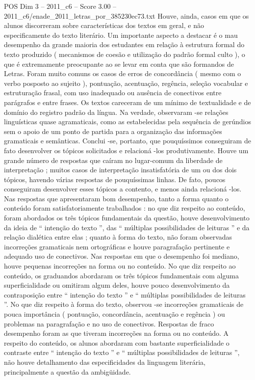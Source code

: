 \begin{textsample}{POS Dim 3 – 2011\_c6 – Score 3.00 – 2011\_c6/enade\_2011\_letras\_por\_385230ec73.txt}
Houve, ainda, casos em que os alunos discorreram sobre características dos textos em geral, e não especificamente do texto literário.
Um importante aspecto a destacar é o mau desempenho da grande maioria dos estudantes em relação à estrutura formal do texto produzido ( mecanismos de coesão e utilização do padrão formal culto ), o que é extremamente preocupante ao se levar em conta que são formandos de Letras.
Foram muito comuns os casos de erros de concordância ( mesmo com o verbo posposto ao sujeito ), pontuação, acentuação, regência, seleção vocabular e estruturação frasal, com uso inadequado ou ausência de conectivos entre parágrafos e entre frases.
Os textos careceram de um mínimo de textualidade e de domínio do registro padrão da língua.
Na verdade, observaram -se relações linguísticas quase agramaticais, como as estabelecidas pela sequência de gerúndios sem o apoio de um ponto de partida para a organização das informações gramaticais e semânticas.
Conclui -se, portanto, que pouquíssimos conseguiram de fato desenvolver os tópicos solicitados e relacioná -los produtivamente.
Houve um grande número de respostas que caíram no lugar-comum da liberdade de interpretação ; muitos casos de interpretação insatisfatória de um ou dos dois tópicos, havendo várias respostas de pouquíssimas linhas.
De fato, poucos conseguiram desenvolver esses tópicos a contento, e menos ainda relacioná -los.
Nas respostas que apresentaram bom desempenho, tanto a forma quanto o conteúdo foram satisfatoriamente trabalhados : no que diz respeito ao conteúdo, foram abordados os três tópicos fundamentais da questão, houve desenvolvimento da ideia de “ intenção do texto ”, das “ múltiplas possibilidades de leituras ” e da relação dialética entre elas ; quanto à forma do texto, não foram observadas incorreções gramaticais nem ortográficas e houve paragrafação pertinente e adequado uso de conectivos.
Nas respostas em que o desempenho foi mediano, houve pequenas incorreções na forma ou no conteúdo.
No que diz respeito ao conteúdo, os graduandos abordaram os três tópicos fundamentais com alguma superficialidade ou omitiram algum deles, houve pouco desenvolvimento da contraposição entre “ intenção do texto ” e “ múltiplas possibilidades de leituras ”.
No que diz respeito à forma do texto, observou -se incorreções gramaticais de pouca importância ( pontuação, concordância, acentuação e regência ) ou problemas na paragrafação e no uso de conectivos.
Respostas de fraco desempenho foram as que tiveram incorreções na forma ou no conteúdo.
A respeito do conteúdo, os alunos abordaram com bastante superficialidade o contraste entre “ intenção do texto ” e “ múltiplas possibilidades de leituras ”, não houve detalhamento das especificidades da linguagem literária, principalmente a questão da ambigüidade.

\end{textsample}
